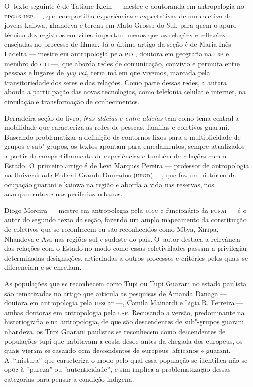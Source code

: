 O~texto seguinte é de Tatiane Klein --- mestre e doutoranda em
antropologia no \textsc{ppgas}-\textsc{usp} ---, que compartilha experiências e
expectativas de um coletivo de jovens kaiowa, nhandeva e terena em Mato
Grosso do Sul, para quem o apuro técnico dos registros em vídeo
importam menos que as relações e reflexões ensejadas no processo de
filmar. Já o último artigo da seção é de Maria Inês Ladeira --- mestre em
antropologia pela \textsc{puc}, doutora em geografia na \textsc{usp} e membro do \textsc{cti} ---,
que aborda redes de comunicação, convívio e permuta entre pessoas e
lugares de \emph{yvy vai}, terra má em que vivemos, marcada pela
transitoriedade dos seres e das relações. Como parte dessas redes, a
autora aborda a participação das novas tecnologias, como telefonia
celular e internet, na circulação e transformação de conhecimentos.

Derradeira seção do livro, \emph{Nas aldeias e entre aldeias} tem como tema
central a mobilidade que caracteriza as redes de pessoas, famílias e
coletivos guarani. Buscando problematizar a definição de contornos
fixos para a multiplicidade de grupos e sub"-grupos, os textos apontam
para enredamentos, sempre atualizados a partir do compartilhamento de
experiências e também de relações com o Estado. O~primeiro artigo é de
Levi Marques Pereira --- professor de antropologia na Universidade
Federal Grande Dourados (\textsc{ufgd}) ---, que faz um histórico da ocupação
guarani e kaiowa na região e aborda a vida nas reservas, nos
acampamentos e nas periferias urbanas. 

Diogo Moreira --- mestre em antropologia pela \textsc{ufsc} e funcionário da \textsc{funai}
--- é o autor do segundo texto da seção, fazendo um amplo mapeamento da
constituição de coletivos que se reconhecem ou são reconhecidos como
Mbya, Xiripa, Nhandeva e Ava nas regiões sul e sudeste do país. O~autor
destaca a relevância das relações com o Estado no modo como essas
coletividades passam a privilegiar determinadas designações,
articuladas a outros processos e critérios pelos quais se diferenciam e
se enredam. 

As populações que se reconhecem como Tupi ou Tupi Guarani no estado
paulista são tematizadas no artigo que articula as pesquisas de Amanda
Danaga --- doutora em antropologia pela \textsc{ufsc}ar ---, Camila Mainardi e Ligia
R. Ferreira --- ambas doutoras em antropologia pela \textsc{usp}. Recusando a
versão, predominante na historiografia e na antropologia, de que são
descendentes de sub"-grupos guarani nhandeva, os Tupi Guarani paulistas
se reconhecem como descendentes de populações tupi que habitavam a
costa desde antes da chegada dos europeus, os quais vieram se casando
com descendentes de europeus, africanos e guarani. A~``mistura'' que
caracteriza o modo pelo qual essa população se identifica não se opõe à
``pureza'' ou ``autenticidade'', e sim implica a problematização dessas
categorias para pensar a condição indígena. 

